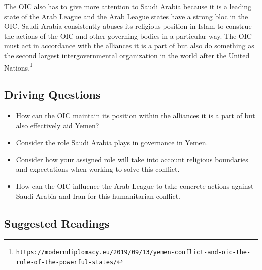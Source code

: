 \documentclass[10pt, letterpaper]{article}
\begin{document}
The OIC also has to give more attention to Saudi Arabia because it is a
leading state of the Arab League and the Arab League states have a
strong bloc in the OIC. Saudi Arabia consistently abuses its religious
position in Islam to construe the actions of the OIC and other governing
bodies in a particular way. The OIC must act in accordance with the
alliances it is a part of but also do something as the second largest
intergovernmental organization in the world after the United
Nations.\footnote{\texttt{\href{https://moderndiplomacy.eu/2019/09/13/yemen-conflict-and-oic-the-role-of-the-powerful-states/}{{https://moderndiplomacy.eu/2019/09/13/yemen-conflict-and-oic-the-role-of-the-powerful-states/}}}} \\

\subsection{Driving Questions}

\begin{itemize}
\item
  
  How can the OIC maintain its position within the alliances it is a
  part of but also effectively aid Yemen?
  
\item
  
  Consider the role Saudi Arabia plays in governance in Yemen.
  
\item
  
  Consider how your assigned role will take into account religious
  boundaries and expectations when working to solve this conflict.
  
\item
  
  How can the OIC influence the Arab League to take concrete actions
  against Saudi Arabia and Iran for this humanitarian conflict.
  
\end{itemize}

\subsection{Suggested Readings}
\end{document}
